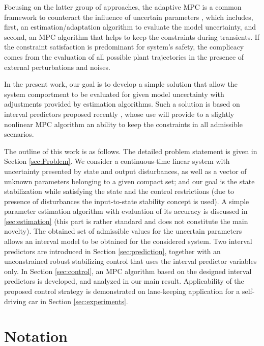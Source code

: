 \documentclass[letterpaper, 10 pt, conference]{ieeeconf}  %
\begin{document}
Focusing on the latter group of approaches, the adaptive MPC is a
common framework to counteract the influence of uncertain parameters
\cite{Fukushima2007,Adetola2009,Adetola2011,Aswani2013,Vicente2019},
which includes, first, an estimation/adaptation algorithm to evaluate
the model uncertainty, and second, an MPC algorithm that helps to
keep the constraints during transients. If the constraint satisfaction
is predominant for system's safety, the complicacy comes from the
evaluation of all possible plant trajectories in the presence of external
perturbations and noises. 

In the present work, our goal is to develop a simple solution that
allow the system comportment to be evaluated for given model uncertainty
with adjustments provided by estimation algorithms. Such a solution
is based on interval predictors proposed recently \cite{Efimov2012,leurent2019interval},
whose use will provide to a slightly nonlinear MPC algorithm an ability
to keep the constraints in all admissible scenarios.

The outline of this work is as follows. The detailed problem statement
is given in Section \ref{sec:Problem}. We consider a continuous-time
linear system with uncertainty presented by state and output disturbances,
as well as a vector of unknown parameters belonging to a given compact
set; and our goal is the state stabilization while satisfying the
state and the control restrictions (due to presence of disturbances
the input-to-state stability concept is used). A simple parameter
estimation algorithm with evaluation of its accuracy is discussed
in \ref{sec:estimation} (this part is rather standard and does
not constitute the main novelty). The obtained set of admissible values
for the uncertain parameters allows an interval model to be obtained
for the considered system. Two interval predictors are introduced
in Section \ref{sec:prediction}, together with an unconstrained robust
stabilizing control that uses the interval predictor variables only.
In Section \ref{sec:control}, an MPC algorithm based on the designed interval predictors is developed, and analyzed in our main result. Applicability
of the proposed control strategy is demonstrated on lane-keeping application for a self-driving car in Section \ref{sec:experiments}.

\section*{Notation}
\end{document}
